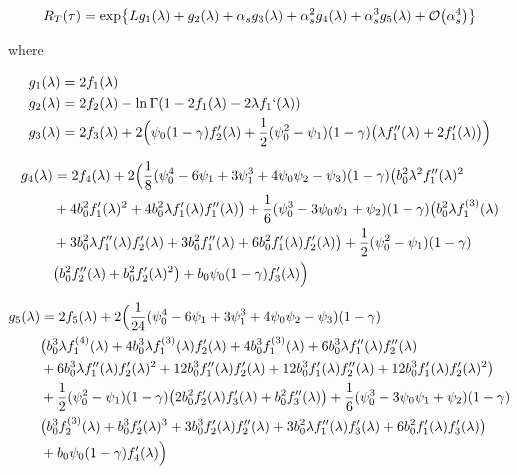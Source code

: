 \documentclass[../main.tex]{subfiles}
\begin{document}
\begin{equation}\label{eq:RT resummed}
    R_T(\tau) = \exp{L g_1(\lambda) + g_2(\lambda) + \alpha_s g_3(\lambda) + \alpha_s^2 g_4(\lambda) + \alpha_s^3 g_5(\lambda) + \order{\alpha_s^4}}
\end{equation}

where

\begin{align}
    & g_1(\lambda) = 2 f_1(\lambda) \\
    & g_2(\lambda) = 2 f_2(\lambda) -  \ln \Gamma(1- 2 f_1(\lambda)- 2 \lambda f_1`(\lambda))\\
    & g_3(\lambda) = 2 f_3(\lambda) + 2  \Bigl( \psi_0(1-\gamma) f_2'(\lambda )  + \frac{1}{2} (\psi_0^2-\psi_1)(1-\gamma)\bigl( \lambda  f_1''(\lambda ) +2  f_1'(\lambda )\bigr)\Bigr)
\end{align}

\begin{align}
    \begin{split}
        g_4(\lambda) &= 2 f_4(\lambda) + 2 \Bigl(\frac{1}{8} (\psi_0^4 -6 \psi_1 + 3\psi_1^3 +4\psi_0\psi_2 -\psi_3)(1-\gamma) \bigl(b_0^2 \lambda ^2 f_1''(\lambda )^2\\
        &+4 b_0^2 f_1'(\lambda )^2 +4 b_0^2 \lambda  f_1'(\lambda ) f_1''(\lambda )\bigr)+\frac{1}{6} (\psi_0^3 -3 \psi_0\psi_1+\psi_2)(1-\gamma) \bigl(b_0^2 \lambda  f_1^{(3)}(\lambda )\\
        &+ 3 b_0^2 \lambda  f_1''(\lambda ) f_2'(\lambda )+3 b_0^2 f_1''(\lambda )+6 b_0^2 f_1'(\lambda ) f_2'(\lambda )\bigr)+\frac{1}{2} (\psi_0^2-\psi_1)(1-\gamma)\\
        &\bigl(b_0^2 f_2''(\lambda )+b_0^2 f_2'(\lambda )^2\bigr) + b_0 \psi_0(1-\gamma) f_3'(\lambda )\Bigr)
    \end{split}
\end{align}

\begin{align}
    \begin{split}
        g_5(\lambda) &= 2 f_5(\lambda) + 2 \Bigl(\frac{1}{24} (\psi_0^4 -6 \psi_1 + 3\psi_1^3 +4\psi_0\psi_2 -\psi_3)(1-\gamma) \\
        &\bigl(b_0^3 \lambda  f_1^{(4)}(\lambda ) +4 b_0^3 \lambda  f_1^{(3)}(\lambda ) f_2'(\lambda ) + 4 b_0^3 f_1^{(3)}(\lambda )+6 b_0^3 \lambda  f_1''(\lambda ) f_2''(\lambda ) \\
        &+ 6 b_0^3 \lambda  f_1''(\lambda ) f_2'(\lambda )^2 +12 b_0^3 f_1''(\lambda ) f_2'(\lambda )+12 b_0^3 f_1'(\lambda ) f_2''(\lambda ) + 12 b_0^3 f_1'(\lambda ) f_2'(\lambda )^2\bigr) \\
        &+ \frac{1}{2} (\psi_0^2-\psi_1)(1-\gamma) \bigl(2 b_0^2 f_2'(\lambda ) f_3'(\lambda )+b_0^2 f_3''(\lambda )\bigr) + \frac{1}{6} (\psi_0^3 -3 \psi_0\psi_1+\psi_2)(1-\gamma) \\
        &\bigl(b_0^3 f_2^{(3)}(\lambda )+b_0^3 f_2'(\lambda )^3 +3 b_0^3 f_2'(\lambda ) f_2''(\lambda )+3 b_0^2 \lambda  f_1''(\lambda ) f_3'(\lambda ) +6 b_0^2 f_1'(\lambda ) f_3'(\lambda )\bigr)\\
        &+ b_0 \psi_0(1-\gamma) f_4'(\lambda ) \Bigr)
    \end{split}
\end{align}

\printbibliography
\end{document}

